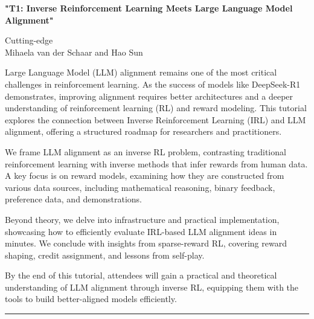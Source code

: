 \begin{center}
    \Large{\textbf{"T1: Inverse Reinforcement Learning Meets Large Language Model Alignment"}\\}
    \par\bigskip
    \large{Cutting-edge}\\
    \large{Mihaela van der Schaar and Hao Sun}\\
    \par\bigskip
    [Website]

\end{center}

Large Language Model (LLM) alignment remains one of the most critical challenges in reinforcement learning. As the success of models like DeepSeek-R1 demonstrates, improving alignment requires better architectures and a deeper understanding of reinforcement learning (RL) and reward modeling. This tutorial explores the connection between Inverse Reinforcement Learning (IRL) and LLM alignment, offering a structured roadmap for researchers and practitioners.

We frame LLM alignment as an inverse RL problem, contrasting traditional reinforcement learning with inverse methods that infer rewards from human data. A key focus is on reward models, examining how they are constructed from various data sources, including mathematical reasoning, binary feedback, preference data, and demonstrations.

Beyond theory, we delve into infrastructure and practical implementation, showcasing how to efficiently evaluate IRL-based LLM alignment ideas in minutes. We conclude with insights from sparse-reward RL, covering reward shaping, credit assignment, and lessons from self-play.

By the end of this tutorial, attendees will gain a practical and theoretical understanding of LLM alignment through inverse RL, equipping them with the tools to build better-aligned models efficiently.

\begin{center}
    \noindent\rule{200px}{1pt}
\end{center}
